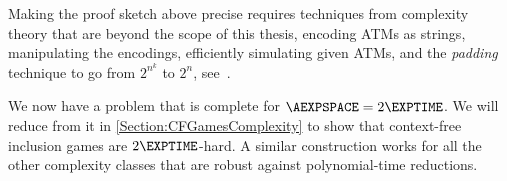 \documentclass[../../diss.tex]{subfiles}
\begin{document}
\begin{remark*}
    Making the proof sketch above precise requires techniques from complexity theory that are beyond the scope of this thesis, \eg encoding ATMs as strings, manipulating the encodings, efficiently simulating given ATMs, and the \emph{padding} technique to go from $2^{n^k}$ to $2^n$, see~\cite{Kozen06}.
\end{remark*}

We now have a problem that is complete for $\AEXPSPACE = 2\EXPTIME$.
We will reduce from it in \cref{Section:CFGamesComplexity} to show that context-free inclusion games are $2\EXPTIME$-hard.
A similar construction works for all the other complexity classes that are robust against polynomial-time reductions.
\end{document}
